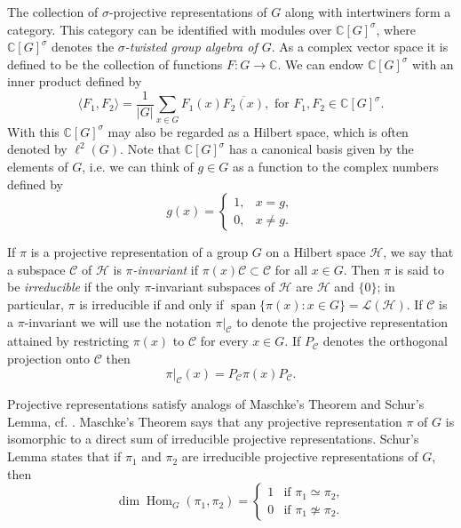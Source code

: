 \documentclass[11pt]{article}
\theoremstyle{definition}
\newcommand{\bbC}{\mathbb{C}}
\newcommand{\calC}{\mathcal{C}}
\newcommand{\calH}{\mathcal{H}}
\newcommand{\calL}{\mathcal{L}}
\newcommand{\Hom}{\operatorname{Hom}}
\newcommand{\Span}{\operatorname{span}}
\begin{document}
The collection of $\sigma$-projective representations of $G$ along with intertwiners form a category. This category can be identified with modules over $\bbC[G]^\sigma$, where $\bbC[G]^\sigma$ denotes the \emph{$\sigma$-twisted group algebra of $G$}. As a complex vector space it is defined to be the collection of functions $F \colon G \to \bbC$. 
We can endow $\bbC[G]^\sigma$ with an inner product defined by
\begin{equation}\label{eqn:inner product}
    \langle F_1, F_2 \rangle = \frac{1}{|G|} \sum_{x \in G}F_1(x) \overline{F_2(x)}, \text{ for } F_1,F_2 \in \bbC[G]^\sigma.
\end{equation}
With this $\bbC[G]^\sigma$ may also be regarded as a Hilbert space, which is often denoted by $\ell^2(G)$. Note that $\bbC[G]^\sigma$ has a canonical basis given by the elements of $G$, i.e. we can think of $g \in G$ as a function to the complex numbers defined by
\[
    g(x) =
    \begin{cases}
        1, & x = g, \\
        0, & x \neq g.
    \end{cases}
\]

If $\pi$ is a projective representation of a group $G$ on a Hilbert space $\calH$, we say that a subspace $\calC$ of $\calH$ is \emph{$\pi$-invariant} if $\pi(x)\calC \subset \calC$ for all $x \in G$. Then $\pi$ is said to be \emph{irreducible} if the only $\pi$-invariant subspaces of $\calH$ are $\calH$ and $\{0\}$; in particular, $\pi$ is irreducible if and only if $\Span\{\pi(x) \colon x \in G \} = \calL(\calH)$. If $\calC$ is a $\pi$-invariant we will use the notation $\pi|_\calC$ to denote the projective representation attained by restricting $\pi(x)$ to $\calC$ for every $x \in G$. If $P_\calC$ denotes the orthogonal projection onto $\calC$ then
\[
    \pi|_\calC(x) = P_\calC\pi(x)P_\calC.
\]

Projective representations satisfy analogs of Maschke's Theorem and Schur's Lemma, cf. \cite[Corollary 7.15]{CeccheriniSilbersteinTullio22}. Maschke's Theorem says that any projective representation $\pi$ of $G$ is isomorphic to a direct sum of irreducible projective representations. Schur's Lemma states that if $\pi_1$ and $\pi_2$ are irreducible projective representations of $G$, then
\begin{equation*}
    \dim \Hom_G(\pi_1,\pi_2) =
    \begin{cases}
        1 & \text{if } \pi_1 \simeq \pi_2, \\
        0 & \text{if } \pi_1 \not\simeq \pi_2.
    \end{cases}
\end{equation*}
\end{document}
